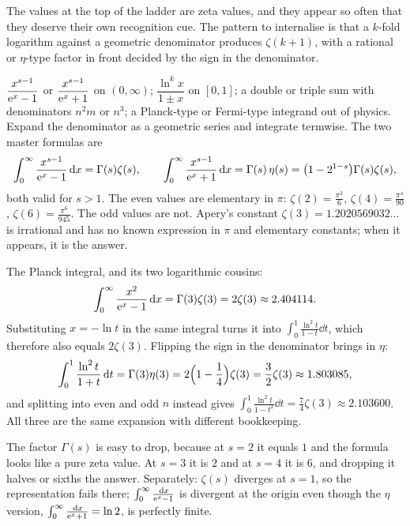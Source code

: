 The values at the top of the ladder are zeta values, and they appear so often that they deserve their own recognition cue. The pattern to internalise is that a $k$-fold logarithm against a geometric denominator produces $\zeta(k+1)$, with a rational or $\eta$-type factor in front decided by the sign in the denominator.

\cue $\dfrac{x^{s-1}}{\mathrm{e}^{x}-1}$ or $\dfrac{x^{s-1}}{\mathrm{e}^{x}+1}$ on $(0,\infty)$; $\dfrac{\ln^{k}x}{1\pm x}$ on $[0,1]$; a double or triple sum with denominators $n^{2}m$ or $n^{3}$; a Planck-type or Fermi-type integrand out of physics.
\method Expand the denominator as a geometric series and integrate termwise. The two master formulas are
\[\int_0^{\infty}\frac{x^{s-1}}{\mathrm{e}^{x}-1}\,\mathrm{d} x=\Gamma(s)\zeta(s),\qquad
\int_0^{\infty}\frac{x^{s-1}}{\mathrm{e}^{x}+1}\,\mathrm{d} x=\Gamma(s)\,\eta(s)=\bigl(1-2^{1-s}\bigr)\Gamma(s)\zeta(s),\]
both valid for $s>1$. The even values are elementary in $\pi$: $\zeta(2)=\tfrac{\pi^{2}}{6}$, $\zeta(4)=\tfrac{\pi^{4}}{90}$, $\zeta(6)=\tfrac{\pi^{6}}{945}$. The odd values are not. Apery's constant $\zeta(3)=1.2020569032\ldots$ is irrational and has no known expression in $\pi$ and elementary constants; when it appears, it is the answer.

\begin{worked}
The Planck integral, and its two logarithmic cousins:
\[\int_0^{\infty}\frac{x^{2}}{\mathrm{e}^{x}-1}\,\mathrm{d} x=\Gamma(3)\zeta(3)=2\zeta(3)\approx2.404114.\]
Substituting $x=-\ln t$ in the same integral turns it into $\int_0^1\frac{\ln^{2}t}{1-t}\dd t$, which therefore also equals $2\zeta(3)$. Flipping the sign in the denominator brings in $\eta$:
\[\int_0^1\frac{\ln^{2}t}{1+t}\,\mathrm{d} t=\Gamma(3)\eta(3)=2\Bigl(1-\frac14\Bigr)\zeta(3)=\frac32\zeta(3)\approx1.803085,\]
and splitting into even and odd $n$ instead gives $\int_0^1\frac{\ln^{2}t}{1-t^{2}}\dd t=\tfrac74\zeta(3)\approx2.103600$. All three are the same expansion with different bookkeeping.
\end{worked}

\begin{trap}
The factor $\Gamma(s)$ is easy to drop, because at $s=2$ it equals $1$ and the formula looks like a pure zeta value. At $s=3$ it is $2$ and at $s=4$ it is $6$, and dropping it halves or sixths the answer. Separately: $\zeta(s)$ diverges at $s=1$, so the representation fails there; $\int_0^{\infty}\frac{\,\mathrm{d} x}{\mathrm{e}^{x}-1}$ is divergent at the origin even though the $\eta$ version, $\int_0^{\infty}\frac{\,\mathrm{d} x}{\mathrm{e}^{x}+1}=\ln2$, is perfectly finite.
\end{trap}

